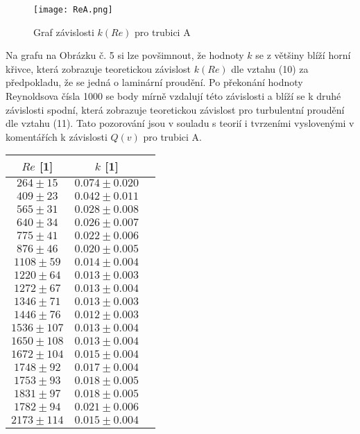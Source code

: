 \documentclass[a4paper]{article}
\begin{document}
\begin{figure}[H]
\centering
\texttt{[image: ReA.png]}
\caption{Graf závislosti $k(Re)$ pro trubici A}
\end{figure}
\par Na grafu na Obrázku č. 5 si lze povšimnout, že hodnoty $k$ se z většiny blíží horní křivce, která zobrazuje teoretickou závislost $k(Re)$ dle vztahu (10) za předpokladu, že se jedná o laminární proudění. Po překonání hodnoty Reynoldsova čísla 1000 se body mírně vzdalují této závislosti a blíží se k druhé závislosti spodní, která zobrazuje teoretickou závislost pro turbulentní proudění dle vztahu (11). Tato pozorování jsou v souladu s teorií i tvrzeními vyslovenými v komentářích k závislosti $Q(v)$ pro trubici A.
\begin{center}
    \label{tab:title}
    \begin{tabular}{ | c | c |  p{3cm} |} \hline
    $Re$ [1] & $k$ [1]    \\  \hline
    $264\pm15$  & $0.074\pm0.020$ \\ \hline
    $409\pm23$  & $0.042\pm0.011$ \\ \hline
    $565\pm31$  & $0.028\pm0.008$ \\ \hline
    $640\pm34$  & $0.026\pm0.007$ \\ \hline
    $775\pm41$  & $0.022\pm0.006$ \\ \hline
    $876\pm46$  & $0.020\pm0.005$ \\ \hline
    $1108\pm59$  & $0.014\pm0.004$ \\ \hline
    $1220\pm64$  & $0.013\pm0.003$ \\ \hline
    $1272\pm67$  & $0.013\pm0.004$ \\ \hline
    $1346\pm71$  & $0.013\pm0.003$ \\ \hline
    $1446\pm76$  & $0.012\pm0.003$ \\ \hline
    $1536\pm107$ & $0.013\pm0.004$ \\ \hline
    $1650\pm108$ & $0.013\pm0.004$ \\ \hline   
    $1672\pm104$ & $0.015\pm0.004$ \\ \hline
    $1748\pm92$  & $0.017\pm0.004$ \\ \hline
    $1753\pm93$  & $0.018\pm0.005$ \\ \hline
    $1831\pm97$  & $0.018\pm0.005$ \\ \hline
    $1782\pm94$  & $0.021\pm0.006$ \\ \hline
    $2173\pm114$ & $0.015\pm0.004$ \\ \hline
\end{tabular}
\end{center}
\end{document}
